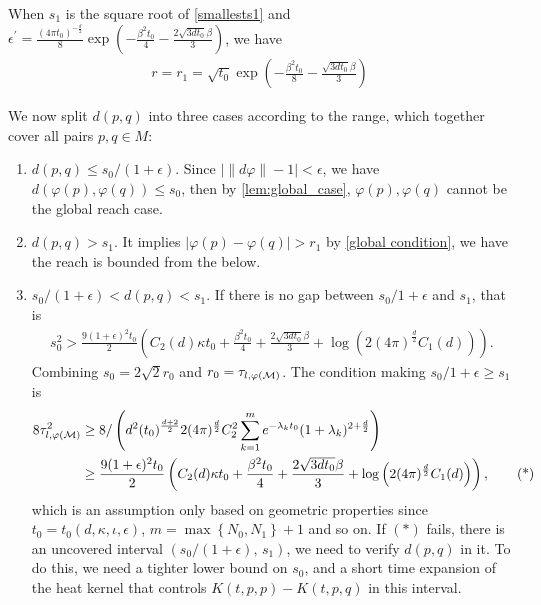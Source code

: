 When $s_1$ is the square root of \cref{smallests1} and  $\epsilon^\prime=\frac{(4\pi t_0)^{-\frac{d}{2}}}{8}\exp\left(-\frac{\beta^2t_0}{4}-\frac{2\sqrt{3dt_0}\beta}{3}\right)$, we have 
\begin{align}
	r=r_1=\sqrt{t_0} \exp\left(-\frac{\beta^2t_0}{8}-\frac{\sqrt{3dt_0}\beta}{3}\right)
\end{align}

We now split $d(p,q)$ into three cases according to the range, which together cover all pairs $p,q\in M$:
\begin{enumerate}
	\item [(i)] $d(p,q)\leq s_0/(1+\epsilon)$. Since $|\|d\varphi\|-1|<\epsilon$, we have $d(\varphi(p),\varphi(q))\leq s_0$, then by \cref{lem:global_case}, $\varphi(p), \varphi(q)$ cannot be the global reach case.
	\item [(ii)] $d(p,q)>s_1$. It implies $|\varphi(p)-\varphi(q)|> r_1$ by \cref{global condition}, we have the reach is bounded from the below.
	\item [(iii)] $s_0/(1+\epsilon) < d(p,q) < s_1$. If there is no gap between $s_0/1+\epsilon$ and $s_1$, that is
	\begin{align}
		s_0^2>\frac{9(1+\epsilon)^2t_0}{2}\left(C_2(d)\kappa t_0 + \frac{\beta^2 t_0}{4}+\frac{2\sqrt{3d t_0}\beta}{3}+\log\left(2(4\pi)^\frac{d}{2}C_1(d)\right)\right).
	\end{align}
	Combining $s_0=2\sqrt{2}r_0$ and $r_0 =\tau_{l,\varphi(\mathcal{M})}$. The condition making $s_0/1+\epsilon \geq s_1$ is 
	\begin{align}
		\label{star}
		8\tau^2_{l,\varphi(\mathcal{M})} &\geq 8/\left(d^2(t_0)^\frac{d+2}{2}2(4\pi)^\frac{d}{2} C_2^2\sum_{k=1}^{m}e^{-\lambda_k t_0} (1+\lambda_k)^{2+\frac{d}{2}} \right) \nonumber \\
		&\geq \frac{9(1+\epsilon)^2t_0}{2}\left(C_2(d)\kappa t_0 + \frac{\beta^2 t_0}{4}+\frac{2\sqrt{3d t_0}\beta}{3}+ \log\left(2(4\pi)^\frac{d}{2}C_1(d)\right)\right), \tag{*}
	\end{align}
	which is an assumption only based on geometric properties since $t_0=t_0(d,\kappa,\iota,\epsilon)$, $m=\max\left\{N_0,N_1\right\}+1$ and so on. If $(*)$ fails, there is an uncovered interval $(s_0/(1+\epsilon),\,s_1)$, we need to verify $d(p,q)$ in it. To do this, we need a tighter lower bound on $s_0$, and a short time expansion of the heat kernel that controls $K(t,p,p)-K(t,p,q)$ in this interval.
\end{enumerate}


